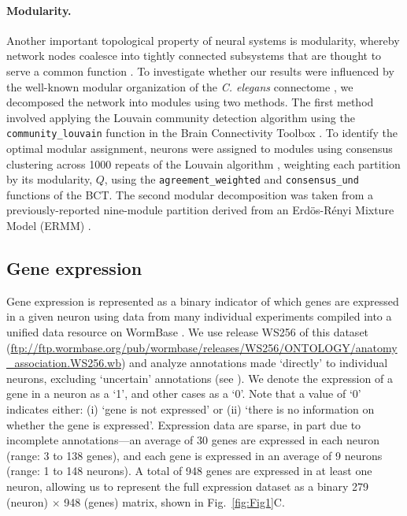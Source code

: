 \documentclass[10pt,letterpaper]{article}
\begin{document}
\paragraph{Modularity.}
Another important topological property of neural systems is modularity, whereby network nodes coalesce into tightly connected subsystems that are thought to serve a common function \cite{Sporns2016}.
To investigate whether our results were influenced by the well-known modular organization of the \emph{C. elegans} connectome \cite{Kim:2014bu, Pan:2010jt, Bassett2010, Achacoso:1992ay, Pavlovic:2014gx}, we decomposed the network into modules using two methods.
The first method involved applying the Louvain community detection algorithm \cite{Blondel:2008do} using the \texttt{community\_louvain} function in the Brain Connectivity Toolbox \cite{Rubinov:2010jd}.
To identify the optimal modular assignment, neurons were assigned to modules using consensus clustering across 1000 repeats of the Louvain algorithm \cite{Lancichinetti2012}, weighting each partition by its modularity, $Q$, using the \texttt{agreement\_weighted} and \texttt{consensus\_und} functions of the BCT\cite{Rubinov:2010jd}.
The second modular decomposition was taken from a previously-reported nine-module partition derived from an Erd\"os-R\'enyi Mixture Model (ERMM) \cite{Pavlovic:2014gx}.

\subsection*{Gene expression}
Gene expression is represented as a binary indicator of which genes are expressed in a given neuron using data from many individual experiments compiled into a unified data resource on WormBase \cite{Harris:2009kd}.
We use release WS256 of this dataset (\url{ftp://ftp.wormbase.org/pub/wormbase/releases/WS256/ONTOLOGY/anatomy_association.WS256.wb}) and analyze annotations made `directly' to individual neurons, excluding `uncertain' annotations (see ).
We denote the expression of a gene in a neuron as a `1', and other cases as a `0'.
Note that a value of `0' indicates either:
(i) `gene is not expressed' or
(ii) `there is no information on whether the gene is expressed'.
Expression data are sparse, in part due to incomplete annotations---an average of 30 genes are expressed in each neuron (range: 3 to 138 genes), and each gene is expressed in an average of 9 neurons (range: 1 to 148 neurons).
A total of 948 genes are expressed in at least one neuron, allowing us to represent the full expression dataset as a binary 279 (neuron) $\times$ 948 (genes) matrix, shown in Fig.~\ref{fig:Fig1}C.
\end{document}
